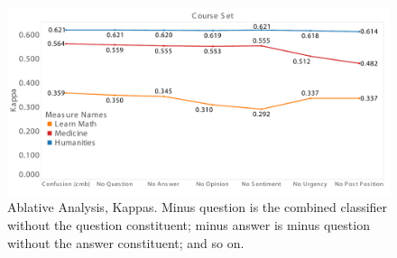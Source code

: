\documentclass{edm_template}
\begin{document}

\begin{figure}[htp]
       \centering
       \includegraphics[width=1.0\textwidth]{../Figs/ablativeAnalysisCropped.pdf}
       \caption{\textnormal{Ablative Analysis, Kappas. Minus question
           is the combined classifier without the question
           constituent; minus answer is minus question without the
           answer constituent; and so on.}}
       \label{fig:ablative}
\end{figure}
\end{document}
